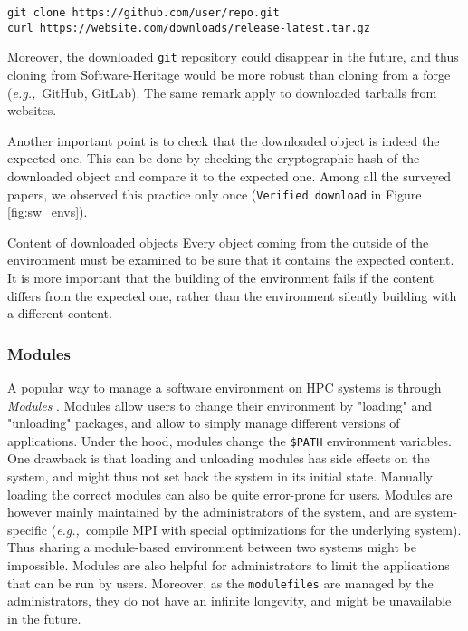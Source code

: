 \documentclass[sigconf,natbib=false]{acmart}
\newcommand{\eg}{\emph{e.g.,}}
\newcommand{\todo}[1]{{\color{red}{TODO: #1}}}
\begin{document}
\begin{verbatim}
git clone https://github.com/user/repo.git
curl https://website.com/downloads/release-latest.tar.gz
\end{verbatim}

Moreover, the downloaded \texttt{git} repository could disappear in the future, and thus cloning from Software-Heritage would be more robust than cloning from a forge (\eg\ GitHub, GitLab).
The same remark apply to downloaded tarballs from websites.

Another important point is to check that the downloaded object is indeed the expected one.
This can be done by checking the cryptographic hash of the downloaded object and compare it to the expected one.
Among all the surveyed papers, we observed this practice only once (\texttt{Verified download} in Figure \ref{fig:sw_envs}).

\begin{lesson}{Content of downloaded objects}{}
Every object coming from the outside of the environment must be examined to be sure that it contains the expected content. 
It is more important that the building of the environment fails if the content differs from the expected one, rather than the environment silently building with a different content.
\end{lesson}

\subsubsection{Modules}

A popular way to manage a software environment on HPC systems is through \emph{Modules} \cite{modules}.
Modules allow users to change their environment by "loading" and "unloading" packages, and allow to simply manage different versions of applications. 
Under the hood, modules change the \texttt{\$PATH} environment variables.
One drawback is that loading and unloading modules has side effects on the system, and might thus not set back the system in its initial state.
Manually loading the correct modules can also be quite error-prone for users.
Modules are however mainly maintained by the administrators of the system, and are system-specific (\eg\ compile MPI with special optimizations for the underlying system).
Thus sharing a module-based environment between two systems might be impossible.
Modules are also helpful for administrators to limit the applications that can be run by users.
Moreover, as the \texttt{modulefiles} are managed by the administrators, they do not have an infinite longevity, and might be unavailable in the future.
\end{document}
